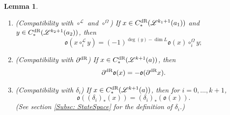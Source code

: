 \documentclass[10pt]{amsart}
\numberwithin{equation}{section}
\theoremstyle{plain}
\newtheorem{lemma}[theorem]{Lemma}
\theoremstyle{definition}
\theoremstyle{remark}
\numberwithin{equation}{section}
\newcommand{\dR}{\textup{dR}}
\begin{document}
{\begin{lemma}\label{Lm: AnomalyApp}
	\begin{enumerate}
		\item (Compatibility with $\circ^\mathscr{L}$ and $\circ^\Omega$) If $x\in C_*^\dR(\mathscr{L}^{k_1+1}(a_1))$ and $y\in C^\dR_*(\mathscr{L}^{k_2+1}(a_2))$, then \[ \mathfrak{o}(x\circ_i^\mathscr{L} y) = (-1)^{\deg(y)-\dim L}\mathfrak{o}(x) \circ_i^\Omega y; \]
		\item (Compatibility with $\partial^\dR$)  If $x\in C_*^\dR(\mathscr{L}^{k+1}(a))$, then \[ \partial^\dR \mathfrak{o}(x) =-\mathfrak{o}(\partial^\dR x). \]
		\item (Compatibility with $\delta_i$) If $x\in C^\dR_*(\mathscr{L}^{k+1}(a))$, then for $i=0,\dots, k+1$, \[ \mathfrak{o}((\delta_i)_*(x)) = (\delta_i)_*(\mathfrak{o}(x)). \](See section \ref{Subsc: StateSpace}  for the definition of $\delta_i$.)
	\end{enumerate}
\end{lemma}

}
\end{document}
